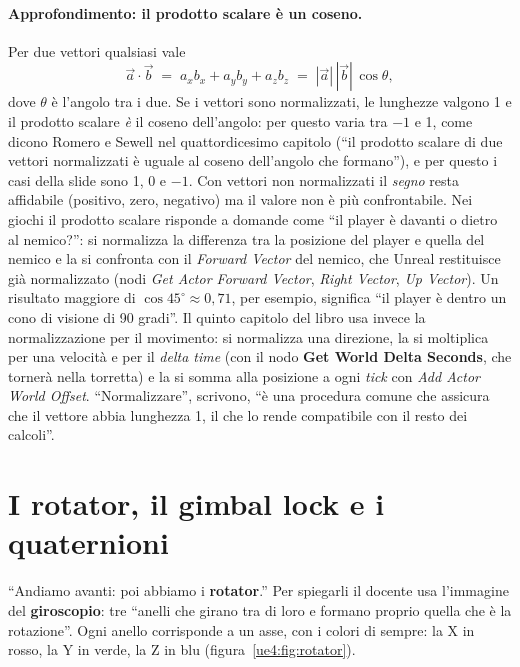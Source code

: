 \paragraph{Approfondimento: il prodotto scalare è un coseno.} Per due vettori qualsiasi
vale
\[
  \vec a \cdot \vec b \;=\; a_x b_x + a_y b_y + a_z b_z \;=\; |\vec a|\,|\vec b|\,
  \cos\theta ,
\]
dove $\theta$ è l'angolo tra i due. Se i vettori sono normalizzati, le lunghezze valgono
1 e il prodotto scalare \emph{è} il coseno dell'angolo: per questo varia tra $-1$ e 1,
come dicono Romero e Sewell nel quattordicesimo capitolo (``il prodotto scalare di due
vettori normalizzati è uguale al coseno dell'angolo che formano''), e per questo i casi
della slide sono 1, 0 e $-1$. Con vettori non normalizzati il \emph{segno} resta
affidabile (positivo, zero, negativo) ma il valore non è più confrontabile. Nei giochi
il prodotto scalare risponde a domande come ``il player è davanti o dietro al
nemico?'': si normalizza la differenza tra la posizione del player e quella del nemico
e la si confronta con il \emph{Forward Vector} del nemico, che Unreal restituisce già
normalizzato (nodi \emph{Get Actor Forward Vector}, \emph{Right Vector}, \emph{Up
Vector}). Un risultato maggiore di $\cos 45^\circ \approx 0{,}71$, per esempio,
significa ``il player è dentro un cono di visione di 90 gradi''. Il quinto capitolo del
libro usa invece la normalizzazione per il movimento: si normalizza una direzione, la si
moltiplica per una velocità e per il \emph{delta time} (con il nodo \textbf{Get World
Delta Seconds}, che tornerà nella torretta) e la si somma alla posizione a ogni
\emph{tick} con \emph{Add Actor World Offset}. ``Normalizzare'', scrivono, ``è una
procedura comune che assicura che il vettore abbia lunghezza 1, il che lo rende
compatibile con il resto dei calcoli''.

\section{I rotator, il gimbal lock e i quaternioni}
\label{ue4:sec:rotator}

``Andiamo avanti: poi abbiamo i \textbf{rotator}.'' Per spiegarli il docente usa
l'immagine del \textbf{giroscopio}: tre ``anelli che girano tra di loro e formano
proprio quella che è la rotazione''. Ogni anello corrisponde a un asse, con i colori di
sempre: la X in rosso, la Y in verde, la Z in blu (figura~\ref{ue4:fig:rotator}).

